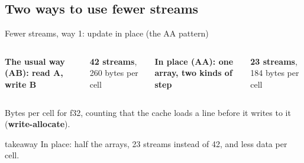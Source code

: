 \documentclass[aspectratio=169,10pt,t]{beamer}
\newcommand{\term}[1]{\textcolor{psblue!85!black}{\textbf{#1}}} %
\newcommand{\takeaway}[1]{\par\vfill
  \begin{beamercolorbox}[wd=\textwidth,sep=4pt,rounded=true]{takeaway}
    \small #1
  \end{beamercolorbox}}
\begin{document}
\subsection{Two ways to use fewer streams}
\begin{frame}{Fewer streams, way 1: update in place (the AA pattern)}
  \vspace{1mm}
  \begin{columns}[T,onlytextwidth]
    {\small\bfseries The usual way (AB): read A, write B\par}
    \vspace{3mm}
    \centering

    \vspace{1mm}
    {\small\textbf{42 streams}, 260 bytes per cell\par}
    {\small\bfseries In place (AA): one array, two kinds of step\par}
    \vspace{1mm}
    \centering

    \vspace{1mm}
    {\small\textbf{23 streams}, 184 bytes per cell\par}
  \end{columns}
  \vfill
  {\scriptsize\color{psgray}Bytes per cell for f32, counting that the cache loads a line before it writes to it
  (\term{write-allocate}).\par}
  \takeaway{In place: half the arrays, 23 streams instead of 42, and less data per cell.}
\end{frame}
\end{document}
